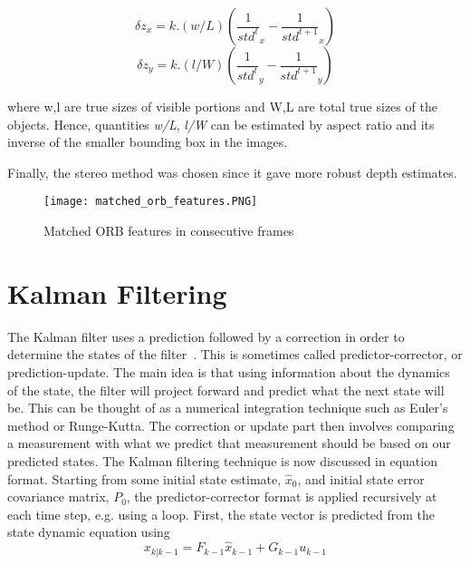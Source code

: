 	\begin{equation}\delta{z}_{x} = k.(w/L)(\frac{1}{std^{t}}_{x} - \frac{1}{std^{t+1}}_{x}) \end{equation}
	\begin{equation}\delta{z}_{y} = k.(l/W)(\frac{1}{std^{t}}_{y} - \frac{1}{std^{t+1}}_{y}) \end{equation}
	
	where w,l are true sizes of visible portions and W,L are total true sizes of the objects. Hence, quantities \emph{w/L}, \emph{l/W} can be estimated by aspect ratio and its inverse of the smaller bounding box in the images.
	
	Finally, the stereo method was chosen since it gave more
	robust depth estimates.
	
	\begin{figure}[htb]
		\centering
		\texttt{[image: matched\_orb\_features.PNG]}
		\caption{Matched ORB features in consecutive frames\label{Matched ORB features in consecutive frames}}
	\end{figure}
	
	
	\section{Kalman Filtering}
	\label{sec:Kalman Filtering}
	The  Kalman  filter  uses  a  prediction  followed  by  a  correction  in  order  to  determine  the  states  of the  filter~\cite{rhudy2017kalman}. This  is  sometimes  called  predictor-corrector, or  prediction-update. The  main  idea  is that using information about the dynamics of the state, the filter will project forward and predict what  the  next  state  will  be. This  can  be  thought  of  as  a  numerical  integration  technique  such  as  Euler’s method   or   Runge-Kutta. The   correction   or   update   part   then   involves   comparing   a measurement with what we predict that measurement should be based on our predicted states. 
	The  Kalman  filtering  technique  is  now  discussed  in  equation  format.    Starting  from  some  initial state  estimate, $\hat{x}_0$,  and  initial  state  error  covariance  matrix, $P_0$,  the  predictor-corrector  format  is applied  recursively  at  each  time  step,  e.g.  using  a  loop. First,  the  state  vector  is  predicted  from the state dynamic equation using 
	\begin{equation}
	\hat{x}_{k|k-1} = F_{k-1}\hat{x}_{k-1} + G_{k-1}u_{k-1}
	\end{equation}
	
